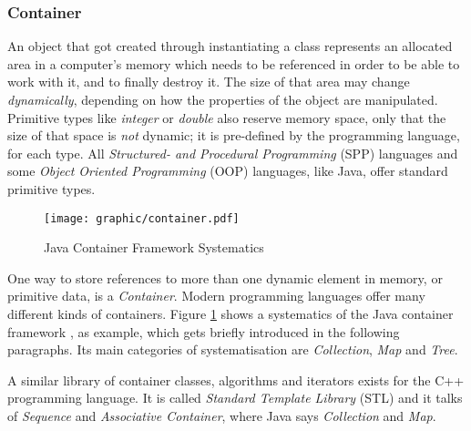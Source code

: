 %
%
%
%
%
%
%

\subsubsection{Container}
\label{container_heading}

An object that got created through instantiating a class represents an
allocated area in a computer's memory which needs to be referenced in order to
be able to work with it, and to finally destroy it. The size of that area may
change \emph{dynamically}, depending on how the properties of the object are
manipulated. Primitive types like \emph{integer} or \emph{double} also reserve
memory space, only that the size of that space is \emph{not} dynamic; it is
pre-defined by the programming language, for each type. All
\emph{Structured- and Procedural Programming} (SPP) languages and some
\emph{Object Oriented Programming} (OOP) languages, like Java, offer standard
primitive types.

\begin{figure}[ht]
    \begin{center}
        \texttt{[image: graphic/container.pdf]}
        \caption{Java Container Framework Systematics}
        \label{container_figure}
    \end{center}
\end{figure}

One way to store references to more than one dynamic element in memory, or
primitive data, is a \emph{Container}. Modern programming languages offer many
different kinds of containers. Figure \ref{container_figure} shows a
systematics of the Java container framework \cite{java}, as example, which gets
briefly introduced in the following paragraphs. Its main categories of
systematisation are \emph{Collection}, \emph{Map} and \emph{Tree}.

A similar library of container classes, algorithms and iterators exists for the
C++ programming language. It is called \emph{Standard Template Library} (STL)
\cite{stl} and it talks of \emph{Sequence} and \emph{Associative Container},
where Java says \emph{Collection} and \emph{Map}.





